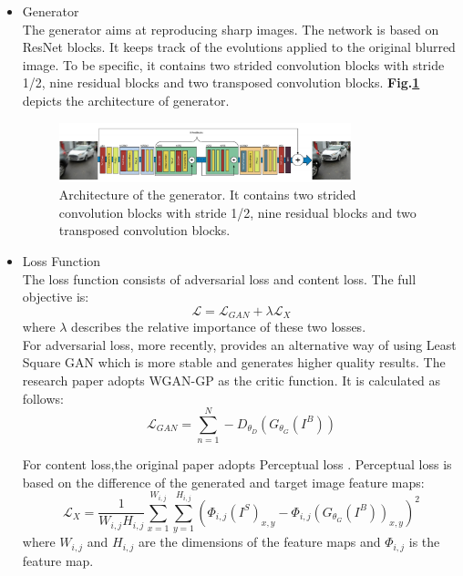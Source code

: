 \documentclass[journal]{IEEEtran}
\begin{document}
\begin{itemize}
	\item Generator\\
	The generator aims at reproducing sharp images. The network is based on ResNet blocks. It keeps track of the evolutions applied to the original blurred image. To be specific, it contains two strided convolution blocks with stride 1/2, nine residual blocks and two transposed convolution blocks. \textbf{Fig.\ref{generator}} depicts the architecture of generator.
	\begin{figure}
		\centering
		\footnotesize
		\includegraphics[width=0.8\textwidth]{fig/generator.png}
		\caption{Architecture of the generator. It contains two strided convolution blocks with stride 1/2, nine residual blocks and two transposed convolution blocks.\cite{deblurgan} }
		\label{generator}
	\end{figure}
	
	\item Loss Function\\
	The loss function consists of adversarial loss and content loss. The full objective is:
	$$
	\mathcal{L}= \mathcal{L}_{GAN} + \lambda\mathcal{L}_{X}
	$$
	where $\lambda$ describes the relative importance of these two losses.\\ 
	For adversarial loss, more recently, \cite{cyclegan} provides an alternative way of using Least Square GAN \cite{Mao} which is more stable and generates higher quality results. The research paper adopts WGAN-GP \cite{Gulrajani} as the critic function. It is calculated as follows:
	$$
	\mathcal{L}_{GAN} = \sum_{n=1}^{N}-D_{\theta_{D}}(G_{\theta_{G}}(I^B))
	$$

	For content loss,the original paper adopts Perceptual loss \cite{Gulrajani}. Perceptual loss is based on the difference of the generated and target image feature maps:
	$$
	\mathcal{L}_{X} = \frac{1}{W_{i,j}H_{i,j}}\sum_{x=1}^{W_{i,j}}\sum_{y=1}^{H_{i,j}}(\Phi_{i,j}(I^S)_{x,y}-\Phi_{i,j}(G_{\theta_G}(I^B))_{x,y})^2
	$$
	where $W_{i,j}$ and $H_{i,j}$ are the dimensions of the feature maps and $\Phi_{i,j}$ is the feature map. 
	
\end{itemize}
\end{document}

